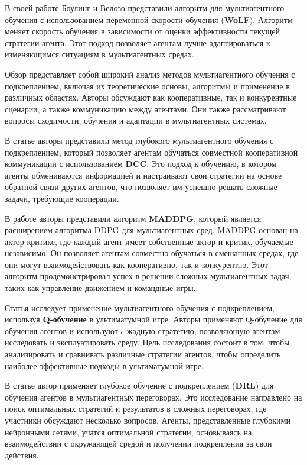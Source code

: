 В своей работе \cite{bowling02} Боулинг и Велозо представили алгоритм для мультиагентного обучения с использованием переменной скорости обучения (\textbf{WoLF}). Алгоритм меняет скорость обучения в зависимости от оценки эффективности текущей стратегии агента. Этот подход позволяет агентам лучше адаптироваться к изменяющимся ситуациям в мультиагентных средах.

Обзор \cite{busoniu08} представляет собой широкий анализ методов мультиагентного обучения с подкреплением, включая их теоретические основы, алгоритмы и применение в различных областях. Авторы обсуждают как кооперативные, так и конкурентные сценарии, а также коммуникацию между агентами. Они также рассматривают вопросы сходимости, обучения и адаптации в мультиагентных системах.

В статье \cite{foerster16} авторы представили метод глубокого мультиагентного обучения с подкреплением, который позволяет агентам обучаться совместной кооперативной коммуникации с использованием \textbf{DCC}. Это подход к обучению, в котором агенты обмениваются информацией и настраивают свои стратегии на основе обратной связи других агентов, что позволяет им успешно решать сложные задачи, требующие кооперации.

В работе \cite{lowe17} авторы представили алгоритм \textbf{MADDPG}, который является расширением алгоритма DDPG для мультиагентных сред. MADDPG основан на актор-критике, где каждый агент имеет собственные актор и критик, обучаемые независимо. Он позволяет агентам совместно обучаться в смешанных средах, где они могут взаимодействовать как кооперативно, так и конкурентно. Этот алгоритм продемонстрировал успех в решении сложных мультиагентных задач, таких как управление движением и командные игры.

Статья \cite{legleau20} исследует применение мультиагентного обучения с подкреплением, используя \textbf{Q-обучение} в ультиматумной игре. Авторы применяют Q-обучение для обучения агентов и используют $\epsilon$-жадную стратегию, позволяющую агентам исследовать и эксплуатировать среду. Цель исследования состоит в том, чтобы анализировать и сравнивать различные стратегии агентов, чтобы определить наиболее эффективные подходы в ультиматумной игре.

В статье \cite{chang20} автор применяет глубокое обучение с подкреплением (\textbf{DRL}) для обучения агентов в мультиагентных переговорах. Это исследование направлено на поиск оптимальных стратегий и результатов в сложных переговорах, где участники обсуждают несколько вопросов. Агенты, представленные глубокими нейронными сетями, учатся оптимальной стратегии, основываясь на взаимодействии с окружающей средой и получении подкрепления за свои действия.

